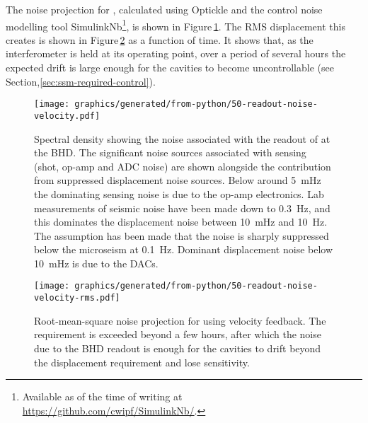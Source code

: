 The noise projection for \LMINUS{}, calculated using Optickle and the control noise modelling tool SimulinkNb\footnote{Available as of the time of writing at \url{https://github.com/cwipf/SimulinkNb/}.}, is shown in Figure\,\ref{fig:readout-noise-velocity}. The \gls{RMS} \LMINUS{} displacement this creates is shown in Figure\,\ref{fig:readout-noise-velocity-rms} as a function of time. It shows that, as the interferometer is held at its operating point, over a period of several hours the expected drift is large enough for the cavities to become uncontrollable (see Section,\ref{sec:ssm-required-control}).

\begin{figure}
  \centering
  \texttt{[image: graphics/generated/from-python/50-readout-noise-velocity.pdf]}
  \caption[Spectral density noise projection for \LMINUS{} using velocity feedback]{\label{fig:readout-noise-velocity}Spectral density showing the noise associated with the readout of \LMINUS{} at the BHD. The significant noise sources associated with sensing (shot, op-amp and ADC noise) are shown alongside the contribution from suppressed displacement noise sources. Below around \SI{5}{\milli\hertz} the dominating sensing noise is due to the op-amp electronics. Lab measurements of seismic noise have been made down to \SI{0.3}{\hertz}, and this dominates the displacement noise between \SI{10}{\milli\hertz} and \SI{10}{\hertz}. The assumption has been made that the noise is sharply suppressed below the microseism at \SI{0.1}{\hertz}. Dominant displacement noise below \SI{10}{\milli\hertz} is due to the \glspl{DAC}.}
\end{figure}

\begin{figure}
  \centering
  \texttt{[image: graphics/generated/from-python/50-readout-noise-velocity-rms.pdf]}
  \caption[Root-mean-square noise projection for \LMINUS{} using velocity feedback]{\label{fig:readout-noise-velocity-rms}Root-mean-square noise projection for \LMINUS{} using velocity feedback. The requirement is exceeded beyond a few hours, after which the noise due to the BHD readout is enough for the cavities to drift beyond the displacement requirement and lose sensitivity.}
\end{figure}

